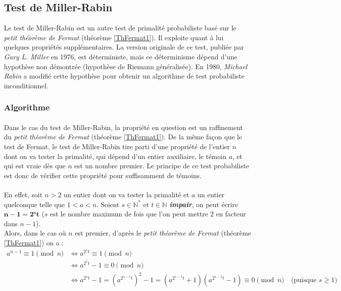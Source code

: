 \subsection{Test de Miller-Rabin}
	Le test de Miller-Rabin est un autre test de primalité probabiliste basé sur le \textit{petit théorème de Fermat} (théorème \ref{ThFermat1}). Il exploite quant à lui quelques propriétés supplémentaires. La version originale de ce test, publiée par \textit{Gary L. Miller} en 1976, est déterministe, mais ce déterminisme dépend d'une hypothèse non démontrée (hypothèse de Riemann généralisée). En 1980, \textit{Michael Rabin} a modifié cette hypothèse pour obtenir un algorithme de test probabiliste inconditionnel.
	
	\subsubsection{Algorithme}
		
		\paragraph{} Dans le cas du test de Miller-Rabin, la propriété en question est un raffinement du \textit{petit théorème de Fermat} (théorème \ref{ThFermat1}). De la même façon que le test de Fermat, le test de Miller-Rabin tire parti d'une propriété de l'entier $n$ dont on va tester la primalité, qui dépend d'un entier auxiliaire, le témoin $a$, et qui est vraie dès que $n$ est un nombre premier. Le principe de ce test probabiliste est donc de vérifier cette propriété pour suffisamment de témoins.
		
		\paragraph{}En effet, soit $n > 2$ un entier dont on va tester la primalité et $a$ un entier quelconque telle que $1 < a < n$. Soient $s \in \mathbb{N}^{*}$ et $t \in \mathbb{N}$ \textbf{\textit{impair}}, on peut écrire $\mathbf{n - 1 = 2^{s}t}$ ($s$ est le nombre maximum de fois que l'on peut mettre $2$ en facteur dans $n - 1$).\\
		Alors, dans le cas où $n$ est premier, d'après le \textit{petit théorème de Fermat} (théorème \ref{ThFermat1}) on a :
		\begin{align*}
			a^{n-1}\equiv 1 \pmod n &\Leftrightarrow a^{2^{s}t}\equiv 1 \pmod n\\
									&\Leftrightarrow a^{2^{s}t} - 1 \equiv 0 \pmod n\\
									&\Leftrightarrow a^{2^{s}t} - 1 = (a^{2^{s-1}t})^{2} - 1 = (a^{2^{s-1}t} + 1)(a^{2^{s-1}t} - 1) \equiv 0 \pmod n	\quad	\text{(puisque } s \geqslant 1 \text{)}
		\end{align*}
		
